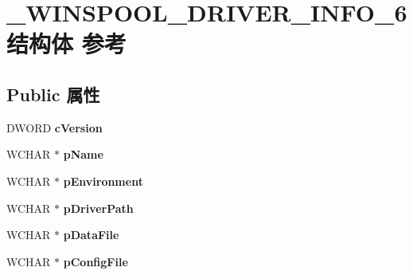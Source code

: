 \hypertarget{struct___w_i_n_s_p_o_o_l___d_r_i_v_e_r___i_n_f_o__6}{}\section{\+\_\+\+W\+I\+N\+S\+P\+O\+O\+L\+\_\+\+D\+R\+I\+V\+E\+R\+\_\+\+I\+N\+F\+O\+\_\+6结构体 参考}
\label{struct___w_i_n_s_p_o_o_l___d_r_i_v_e_r___i_n_f_o__6}
\subsection*{Public 属性}
\begin{DoxyCompactItemize}
\item 
\mbox{\label{struct___w_i_n_s_p_o_o_l___d_r_i_v_e_r___i_n_f_o__6_aa4f6ce656faf24d64ff1ac0fde6493bc}} 
D\+W\+O\+RD {\bfseries c\+Version}
\item 
\mbox{\label{struct___w_i_n_s_p_o_o_l___d_r_i_v_e_r___i_n_f_o__6_af11056ab07c92ead9952d3f138d3078f}} 
W\+C\+H\+AR $\ast$ {\bfseries p\+Name}
\item 
\mbox{\label{struct___w_i_n_s_p_o_o_l___d_r_i_v_e_r___i_n_f_o__6_ad7cefbd4d98e7bea9ca396c5e7032c10}} 
W\+C\+H\+AR $\ast$ {\bfseries p\+Environment}
\item 
\mbox{\label{struct___w_i_n_s_p_o_o_l___d_r_i_v_e_r___i_n_f_o__6_aae9d38917a2644c0b4068c72a9e753e0}} 
W\+C\+H\+AR $\ast$ {\bfseries p\+Driver\+Path}
\item 
\mbox{\label{struct___w_i_n_s_p_o_o_l___d_r_i_v_e_r___i_n_f_o__6_a1498bd0052000357a22c7a68b674299c}} 
W\+C\+H\+AR $\ast$ {\bfseries p\+Data\+File}
\item 
\mbox{\label{struct___w_i_n_s_p_o_o_l___d_r_i_v_e_r___i_n_f_o__6_afa68ac64d44bbf94dfeb97bb422dae1d}} 
W\+C\+H\+AR $\ast$ {\bfseries p\+Config\+File}
\item 

\end{DoxyCompactItemize}

